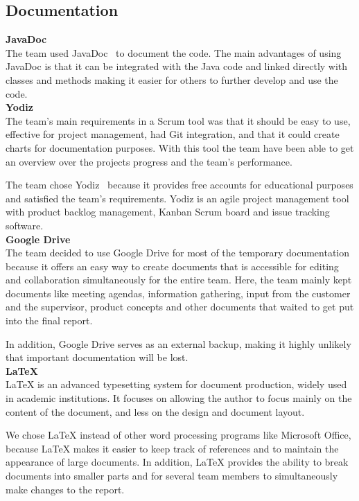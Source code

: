 \subsection{Documentation}

\noindent\textbf{JavaDoc}\\
The team used JavaDoc~\cite{javadoc} to document the code. The main advantages of using JavaDoc is that it can be integrated with the Java code and linked directly with classes and methods making it easier for others to further develop and use the code.\\

\noindent\textbf{Yodiz}\\
The team's main requirements in a Scrum tool was that it should be easy to use, effective for project management, had Git integration, and that it could create charts for documentation purposes. With this tool the team have been able to get an overview over the projects progress and the team's performance. 

The team chose Yodiz~\cite{yodiz} because it provides free accounts for educational purposes and satisfied the team's requirements. Yodiz is an agile project management tool with product backlog management, Kanban Scrum board and issue tracking software.\\

\noindent\textbf{Google Drive}\\
The team decided to use Google Drive for most of the temporary documentation because it offers an easy way to create documents that is accessible for editing and collaboration simultaneously for the entire team. Here, the team mainly kept documents like meeting agendas, information gathering, input from the customer and the supervisor, product concepts and other documents that waited to get put into the final report. 

In addition, Google Drive serves as an external backup, making it highly unlikely that important documentation will be lost. \\


\noindent\textbf{\LaTeX}\\
LaTeX is an advanced typesetting system for document production, widely used in
academic institutions. It focuses on allowing the author to focus mainly on the content of the document, and less on the design and document layout.

We chose LaTeX instead of other word processing programs like Microsoft Office, because LaTeX makes it easier to keep track of references and to maintain the appearance of large
documents. In addition, LaTeX provides the ability to break documents into smaller parts and for several team members to simultaneously make changes to the report.

